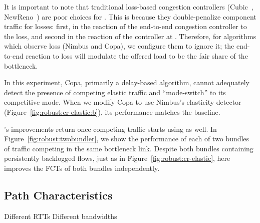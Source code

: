 It is important to note that traditional loss-based congestion controllers (\ie Cubic~\cite{cubic}, NewReno~\cite{newreno}) are poor choices for \name. 
This is because they double-penalize component traffic for losses: first, in the reaction of the end-to-end congestion controller to the loss, and second in the reaction of the controller at \name.
Therefore, for algorithms which observe loss (Nimbus and Copa), we configure them to ignore it; the end-to-end reaction to loss will modulate the offered load to be the fair share of the bottleneck.

In this experiment, Copa, primarily a delay-based algorithm, cannot adequately detect the presence of competing elastic traffic and ``mode-switch'' to its competitive mode. When we modify Copa to use Nimbus's elasticity detector (Figure~\ref{fig:robust:cr-elastic:b}), its performance matches the baseline.


 \name's improvements return once competing traffic starts using \name as well. In Figure~\ref{fig:robust:twobundler}, we show the performance of each of two bundles of traffic competing in the same bottleneck link. 
Despite both bundles containing persistently backlogged flows, just as in Figure~\ref{fig:robust:cr-elastic}, here \name improves the FCTs of both bundles independently.

\subsection{Path Characteristics}\label{s:robust:path}
\begin{outline}
\1 Different RTTs
\1 Different bandwidths
\end{outline}

